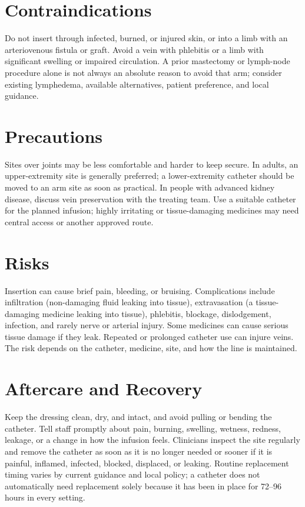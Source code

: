 \section*{Contraindications}
Do not insert through infected, burned, or injured skin, or into a limb with an arteriovenous fistula or graft. Avoid a vein with phlebitis or a limb with significant swelling or impaired circulation. A prior mastectomy or lymph-node procedure alone is not always an absolute reason to avoid that arm; consider existing lymphedema, available alternatives, patient preference, and local guidance.

\section*{Precautions}
Sites over joints may be less comfortable and harder to keep secure. In adults, an upper-extremity site is generally preferred; a lower-extremity catheter should be moved to an arm site as soon as practical. In people with advanced kidney disease, discuss vein preservation with the treating team. Use a suitable catheter for the planned infusion; highly irritating or tissue-damaging medicines may need central access or another approved route.

\section*{Risks}
Insertion can cause brief pain, bleeding, or bruising. Complications include infiltration (non-damaging fluid leaking into tissue), extravasation (a tissue-damaging medicine leaking into tissue), phlebitis, blockage, dislodgement, infection, and rarely nerve or arterial injury. Some medicines can cause serious tissue damage if they leak. Repeated or prolonged catheter use can injure veins. The risk depends on the catheter, medicine, site, and how the line is maintained.

\section*{Aftercare and Recovery}
Keep the dressing clean, dry, and intact, and avoid pulling or bending the catheter. Tell staff promptly about pain, burning, swelling, wetness, redness, leakage, or a change in how the infusion feels. Clinicians inspect the site regularly and remove the catheter as soon as it is no longer needed or sooner if it is painful, inflamed, infected, blocked, displaced, or leaking. Routine replacement timing varies by current guidance and local policy; a catheter does not automatically need replacement solely because it has been in place for 72–96 hours in every setting.

